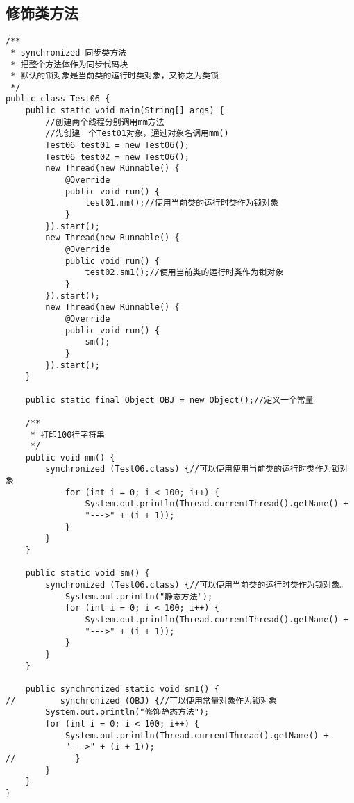 \documentclass[a4paper]{report}
\begin{document}
\subsection{修饰类方法}
\begin{Verbatim}[frame=single,numbersep=5pt,xleftmargin=1.5em,xrightmargin=1.5em]
/**
 * synchronized 同步类方法
 * 把整个方法体作为同步代码块
 * 默认的锁对象是当前类的运行时类对象，又称之为类锁
 */
public class Test06 {
    public static void main(String[] args) {
        //创建两个线程分别调用mm方法
        //先创建一个Test01对象，通过对象名调用mm()
        Test06 test01 = new Test06();
        Test06 test02 = new Test06();
        new Thread(new Runnable() {
            @Override
            public void run() {
                test01.mm();//使用当前类的运行时类作为锁对象
            }
        }).start();
        new Thread(new Runnable() {
            @Override
            public void run() {
                test02.sm1();//使用当前类的运行时类作为锁对象
            }
        }).start();
        new Thread(new Runnable() {
            @Override
            public void run() {
                sm();
            }
        }).start();
    }

    public static final Object OBJ = new Object();//定义一个常量

    /**
     * 打印100行字符串
     */
    public void mm() {
        synchronized (Test06.class) {//可以使用使用当前类的运行时类作为锁对象
            for (int i = 0; i < 100; i++) {
                System.out.println(Thread.currentThread().getName() +
                "--->" + (i + 1));
            }
        }
    }

    public static void sm() {
        synchronized (Test06.class) {//可以使用当前类的运行时类作为锁对象。
            System.out.println("静态方法");
            for (int i = 0; i < 100; i++) {
                System.out.println(Thread.currentThread().getName() +
                "--->" + (i + 1));
            }
        }
    }

    public synchronized static void sm1() {
//         synchronized (OBJ) {//可以使用常量对象作为锁对象
        System.out.println("修饰静态方法");
        for (int i = 0; i < 100; i++) {
            System.out.println(Thread.currentThread().getName() +
            "--->" + (i + 1));
//            }
        }
    }
}
\end{Verbatim}
\end{document}
